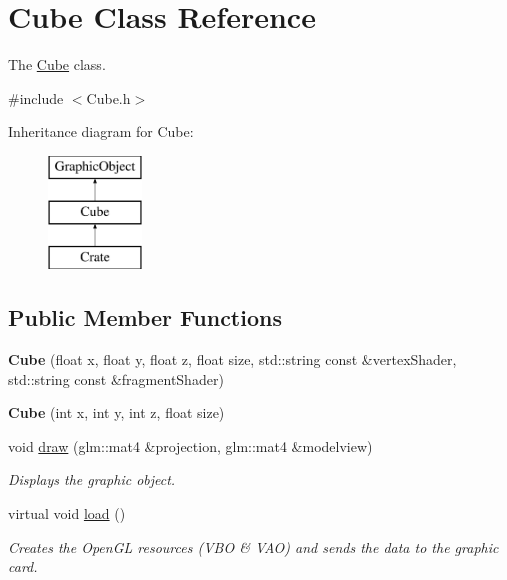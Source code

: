 \hypertarget{classCube}{}\section{Cube Class Reference}
\label{classCube}


The \hyperlink{classCube}{Cube} class.  




{\ttfamily \#include $<$Cube.\+h$>$}

Inheritance diagram for Cube\+:\begin{figure}[H]
\begin{center}
\leavevmode
\includegraphics[height=3.000000cm]{classCube}
\end{center}
\end{figure}
\subsection*{Public Member Functions}
\begin{DoxyCompactItemize}
\item 
\hypertarget{classCube_ab8c70b8c650e3beaf14e4cbc21fec119}{}{\bfseries Cube} (float x, float y, float z, float size, std\+::string const \&vertex\+Shader, std\+::string const \&fragment\+Shader)\label{classCube_ab8c70b8c650e3beaf14e4cbc21fec119}

\item 
\hypertarget{classCube_a52ff32bc507c650318f23454388bfd61}{}{\bfseries Cube} (int x, int y, int z, float size)\label{classCube_a52ff32bc507c650318f23454388bfd61}

\item 
void \hyperlink{classCube_a4646f297e874e0dad42288ad153fc761}{draw} (glm\+::mat4 \&projection, glm\+::mat4 \&modelview)
\begin{DoxyCompactList}\small\item\em Displays the graphic object. \end{DoxyCompactList}\item 
\hypertarget{classCube_aa1326a13ad32a031f8c8f9bcf8f63b2a}{}virtual void \hyperlink{classCube_aa1326a13ad32a031f8c8f9bcf8f63b2a}{load} ()\label{classCube_aa1326a13ad32a031f8c8f9bcf8f63b2a}

\begin{DoxyCompactList}\small\item\em Creates the Open\+G\+L resources (V\+B\+O \& V\+A\+O) and sends the data to the graphic card. \end{DoxyCompactList}\end{DoxyCompactItemize}
